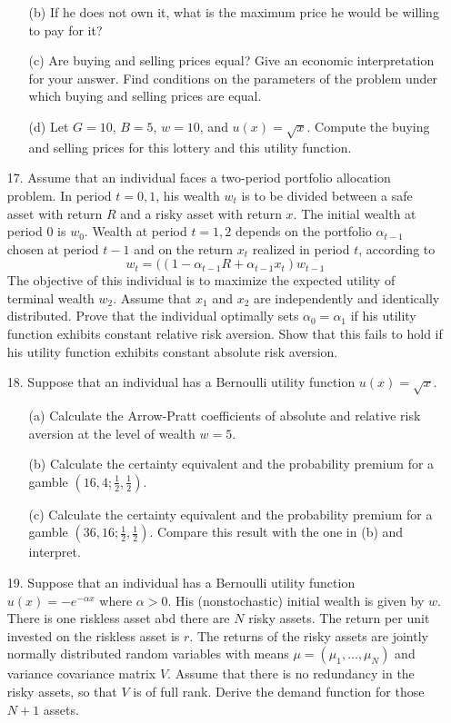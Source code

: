 \documentclass[12pt]{article}
\begin{document}
\begin{itemize}
\begin{itemize}
		\item[(b)] If he does not own it, what is the maximum price he would be willing to pay for it?
		\item[(c)] Are buying and selling prices equal? Give an economic interpretation for your answer. Find conditions on the parameters of the problem under which buying and selling prices are equal.
		\item[(d)] Let $G = 10$, $B = 5$, $w = 10$, and $u(x) = \sqrt{x}$. Compute the buying and selling prices for this lottery and this utility function.
	\end{itemize}
	\item[17.] Assume that an individual faces a two-period portfolio allocation problem. In period $t = 0,1$, his wealth $w_t$ is to be divided between a safe asset with return $R$ and a risky asset with return $x$. The initial wealth at period 0 is $w_0$. Wealth at period $t = 1,2$ depends on the portfolio $\alpha_{t-1}$ chosen at period $t-1$ and on the return $x_t$ realized in period $t$, according to
	\[
	w_t = ((1-\alpha_{t-1}R + \alpha_{t-1}x_t)w_{t-1}
	\]
	The objective of this individual is to maximize the expected utility of terminal wealth $w_2$. Assume that $x_1$ and $x_2$ are independently and identically distributed. Prove that the individual optimally sets $\alpha_0 = \alpha_1$ if his utility function exhibits constant relative risk aversion. Show that this fails to hold if his utility function exhibits constant absolute risk aversion.
	\item[18.] Suppose that an individual has a Bernoulli utility function $u(x) = \sqrt{x}$.
	\begin{itemize}
		\item[(a)] Calculate the Arrow-Pratt coefficients of absolute and relative risk aversion at the level of wealth $w = 5$.
		\item[(b)] Calculate the certainty equivalent and the probability premium for a gamble $(16,4;\frac{1}{2},\frac{1}{2})$.
		\item[(c)] Calculate the certainty equivalent and the probability premium for a gamble $(36,16;\frac{1}{2},\frac{1}{2})$. Compare this result with the one in (b) and interpret.
	\end{itemize}
	\item[19.] Suppose that an individual has a Bernoulli utility function $u(x) = -e^{-\alpha x}$ where $\alpha > 0$. His (nonstochastic) initial wealth is given by $w$. There is one riskless asset abd there are $N$ risky assets. The return per unit invested on the riskless asset is $r$. The returns of the risky assets are jointly normally distributed random variables with means $\mu = (\mu_1,\dots,\mu_N)$ and variance covariance matrix $V$. Assume that there is no redundancy in the risky assets, so that $V$ is of full rank. Derive the demand function for those $N+1$ assets.
\end{itemize}
\end{document}
